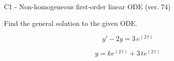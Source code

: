 \begin{exercise}
  \begin{exerciseTitle}C1 - Non-homogeneous first-order linear ODE (ver. 74)\end{exerciseTitle}
  \begin{exerciseStatement}
    
Find the general solution to the given ODE.

    
\[y'-2y= 3 \, e^{\left(2 \, t\right)}\]

  \end{exerciseStatement}
  \begin{exerciseAnswer}
    
\[y= k e^{\left(2 \, t\right)} + 3 \, t e^{\left(2 \, t\right)}\]

  \end{exerciseAnswer}
\end{exercise}